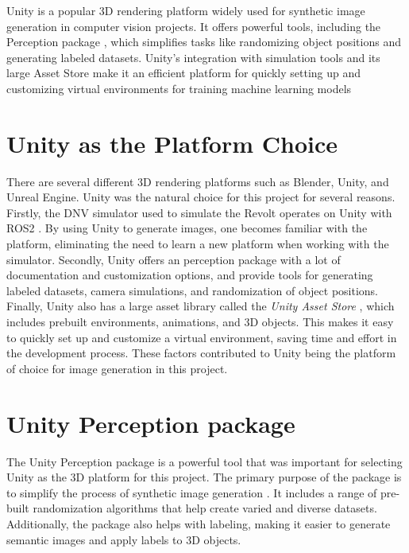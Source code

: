 Unity is a popular 3D rendering platform widely used for synthetic image generation in computer vision projects. It offers powerful tools, including the Perception package \cite{unity-perception2022}, which simplifies tasks like randomizing object positions and generating labeled datasets. Unity's integration with simulation tools and its large Asset Store \cite{UnityAssetStore} make it an efficient platform for quickly setting up and customizing virtual environments for training machine learning models

\section{Unity as the Platform Choice}
There are several different 3D rendering platforms such as Blender, Unity, and Unreal Engine. Unity was the natural choice for this project for several reasons. Firstly, the DNV simulator used to simulate the Revolt operates on Unity with ROS2 \cite{dnv_wiki}. By using Unity to generate images, one becomes familiar with the platform, eliminating the need to learn a new platform when working with the simulator. Secondly, Unity offers an perception package \cite{unity-perception2022} with a lot of documentation and customization options, and provide tools for generating labeled datasets, camera simulations, and randomization of object positions. Finally, Unity also has a large asset library called the \textit{Unity Asset Store} \cite{UnityAssetStore}, which includes prebuilt environments, animations, and 3D objects. This makes it easy to quickly set up and customize a virtual environment, saving time and effort in the development process. These factors contributed to Unity being the platform of choice for image generation in this project.


\section{Unity Perception package}
The Unity Perception package \cite{unity-perception2022} is a powerful tool that was important for selecting Unity as the 3D platform for this project. The primary purpose of the package is to simplify the process of synthetic image generation \cite{borkman2021unityperceptiongeneratesynthetic}. It includes a range of pre-built randomization algorithms that help create varied and diverse datasets. Additionally, the package also helps with labeling, making it easier to generate semantic images and apply labels to 3D objects.


